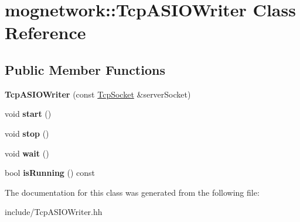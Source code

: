 \hypertarget{classmognetwork_1_1_tcp_a_s_i_o_writer}{\section{mognetwork\-:\-:Tcp\-A\-S\-I\-O\-Writer Class Reference}
\label{classmognetwork_1_1_tcp_a_s_i_o_writer}
}
\subsection*{Public Member Functions}
\begin{DoxyCompactItemize}
\item 
\hypertarget{classmognetwork_1_1_tcp_a_s_i_o_writer_a2f3e28c351689798ba897585c220abaf}{{\bfseries Tcp\-A\-S\-I\-O\-Writer} (const \hyperlink{classmognetwork_1_1_tcp_socket}{Tcp\-Socket} \&server\-Socket)}\label{classmognetwork_1_1_tcp_a_s_i_o_writer_a2f3e28c351689798ba897585c220abaf}

\item 
\hypertarget{classmognetwork_1_1_tcp_a_s_i_o_writer_ac7adf2ec565c463b28f7b584be565863}{void {\bfseries start} ()}\label{classmognetwork_1_1_tcp_a_s_i_o_writer_ac7adf2ec565c463b28f7b584be565863}

\item 
\hypertarget{classmognetwork_1_1_tcp_a_s_i_o_writer_a72d4c74cb2fb05c23f6245de796a0928}{void {\bfseries stop} ()}\label{classmognetwork_1_1_tcp_a_s_i_o_writer_a72d4c74cb2fb05c23f6245de796a0928}

\item 
\hypertarget{classmognetwork_1_1_tcp_a_s_i_o_writer_ad3bd21b81839315d4409914f30de8652}{void {\bfseries wait} ()}\label{classmognetwork_1_1_tcp_a_s_i_o_writer_ad3bd21b81839315d4409914f30de8652}

\item 
\hypertarget{classmognetwork_1_1_tcp_a_s_i_o_writer_a0117301d2bb36f3d2b44039e16dd286d}{bool {\bfseries is\-Running} () const }\label{classmognetwork_1_1_tcp_a_s_i_o_writer_a0117301d2bb36f3d2b44039e16dd286d}

\end{DoxyCompactItemize}


The documentation for this class was generated from the following file\-:\begin{DoxyCompactItemize}
\item 
include/Tcp\-A\-S\-I\-O\-Writer.\-hh\end{DoxyCompactItemize}
